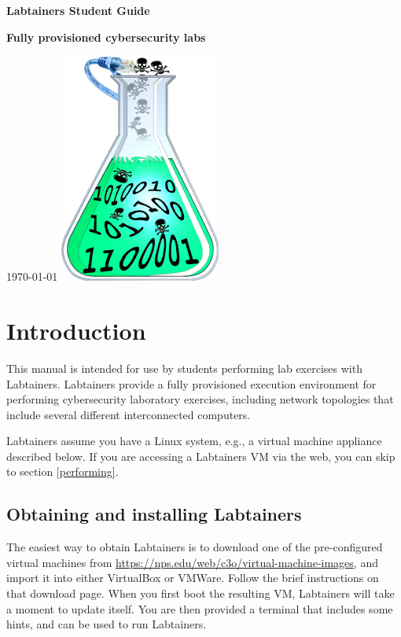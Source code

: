 \documentclass[12pt]{article}
\begin{document}
\begin{titlepage}
\centering
\vfill
\vspace*{4\baselineskip}
{\bfseries\Large
Labtainers Student Guide\par
}
\vspace*{4\baselineskip}
{\bfseries
Fully provisioned cybersecurity labs\par
}
\vspace*{2\baselineskip}
\today
\vfill
\includegraphics[natwidth=200, natheight=286]{labtainer5-sm.png}
\vfill
\end{titlepage}

\section {Introduction}
This manual is intended for use by students performing lab exercises with Labtainers.
Labtainers provide a fully provisioned execution environment for performing
cybersecurity laboratory exercises, including network topologies that include several different
interconnected computers.

Labtainers assume you have a Linux system, e.g., a virtual machine appliance described below.
If you are accessing a Labtainers VM via the web, you can skip to section \ref{performing}.

\subsection{Obtaining and installing Labtainers}
The easiest way to obtain Labtainers is to download one of the pre-configured virtual machines from
\url{https://nps.edu/web/c3o/virtual-machine-images}, and import it into either VirtualBox or VMWare.
Follow the brief instructions on that download page.  When you first boot the resulting VM,
Labtainers will take a moment to update itself.  You are then provided a terminal that includes
some hints, and can be used to run Labtainers.  
\end{document}
